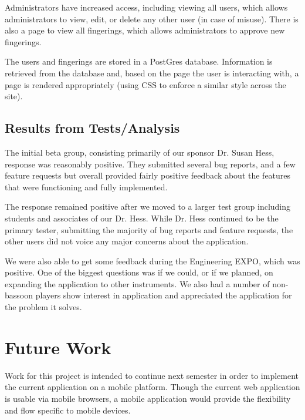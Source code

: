 \documentclass[12pt,english]{article}
\begin{document}
Administrators have increased access, including viewing all users,
which allows administrators to view, edit, or delete any other user
(in case of misuse). There is also a page to view all fingerings,
which allows administrators to approve new fingerings.

The users and fingerings are stored in a PostGres database. Information
is retrieved from the database and, based on the page the user is
interacting with, a page is rendered appropriately (using CSS to enforce
a similar style across the site). 


\subsection{Results from Tests/Analysis}

The initial beta group, consisting primarily of our sponsor Dr. Susan
Hess, response was reasonably positive. They submitted several bug
reports, and a few feature requests but overall provided fairly positive
feedback about the features that were functioning and fully implemented.

The response remained positive after we moved to a larger test group
including students and associates of our Dr. Hess. While Dr. Hess
continued to be the primary tester, submitting the majority of bug
reports and feature requests, the other users did not voice any major
concerns about the application.

We were also able to get some feedback during the Engineering EXPO,
which was positive. One of the biggest questions was if we could,
or if we planned, on expanding the application to other instruments.
We also had a number of non-bassoon players show interest in application
and appreciated the application for the problem it solves.


\section{Future Work}

Work for this project is intended to continue next semester in order
to implement the current application on a mobile platform. Though
the current web application is usable via mobile browsers, a mobile
application would provide the flexibility and flow specific to mobile
devices.
\end{document}
